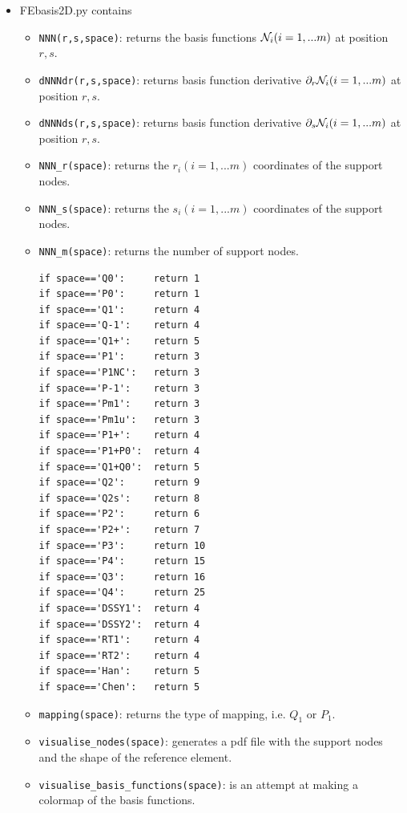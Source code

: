\begin{itemize}

\item {\pythonfile FEbasis2D.py} contains 

\begin{itemize}
\item \lstinline{NNN(r,s,space)}: returns the basis functions ${\mathcal{N}}_i (i=1,...m)$ at position $r,s$.
\item \lstinline{dNNNdr(r,s,space)}: returns basis function derivative $\partial_r{\mathcal{N}}_i (i=1,...m)$ at position $r,s$.
\item \lstinline{dNNNds(r,s,space)}: returns basis function derivative $\partial_s{\mathcal{N}}_i (i=1,...m)$ at position $r,s$.
\item \lstinline{NNN_r(space)}: returns the $r_i (i=1,...m)$ coordinates of the support nodes.
\item \lstinline{NNN_s(space)}: returns the $s_i (i=1,...m)$ coordinates of the support nodes.

\item \lstinline{NNN_m(space)}: returns the number of support nodes.
\begin{lstlisting}
if space=='Q0':     return 1
if space=='P0':     return 1
if space=='Q1':     return 4
if space=='Q-1':    return 4
if space=='Q1+':    return 5
if space=='P1':     return 3
if space=='P1NC':   return 3
if space=='P-1':    return 3
if space=='Pm1':    return 3
if space=='Pm1u':   return 3
if space=='P1+':    return 4
if space=='P1+P0':  return 4
if space=='Q1+Q0':  return 5
if space=='Q2':     return 9
if space=='Q2s':    return 8
if space=='P2':     return 6
if space=='P2+':    return 7
if space=='P3':     return 10
if space=='P4':     return 15
if space=='Q3':     return 16
if space=='Q4':     return 25
if space=='DSSY1':  return 4
if space=='DSSY2':  return 4
if space=='RT1':    return 4
if space=='RT2':    return 4
if space=='Han':    return 5
if space=='Chen':   return 5
\end{lstlisting}


\item \lstinline{mapping(space)}: returns the type of mapping, i.e. $Q_1$ or $P_1$.
\item \lstinline{visualise_nodes(space)}: generates a pdf file with the support nodes 
and the shape of the reference element.
\item \lstinline{visualise_basis_functions(space)}: is an attempt at making a colormap of the basis functions.
\end{itemize}



\end{itemize}
